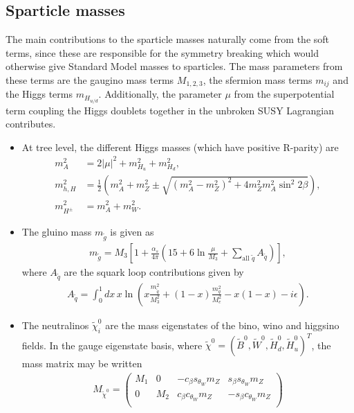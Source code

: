 \documentclass[twoside,english]{uiofysmaster}
\begin{document}
 \subsection{Sparticle masses}
 The main contributions to the sparticle masses naturally come from the soft terms, since these are responsible for the symmetry breaking which would otherwise give Standard Model masses to sparticles. The mass parameters from these terms are the gaugino mass terms $M_{1,2,3}$, the sfermion mass terms $m_{ij}$ and the Higgs terms $m_{H_{u/d}}$. Additionally, the parameter $\mu$ from the superpotential term coupling the Higgs doublets together in the unbroken SUSY Lagrangian contributes.
 \begin{itemize}
 	\item At tree level, the different Higgs masses (which have positive R-parity) are
 	\begin{align}
 		m_A^2 &= 2|\mu|^2 + m^2_{H_u} + m^2_{H_d},\nonumber\\
 		m^2_{h,H} &= \frac{1}{2} \left( m_A^2 + m_Z^2 \pm \sqrt{(m_A^2 - m_Z^2)^2 + 4m_Z^2m_A^2\sin^2 2\beta} \right),\\
 		m^2_{H^\pm} &= m_A^2 + m_W^2.\nonumber
 	\end{align}
 	\item The gluino mass $m_{\tilde g}$ is given as
 	\begin{align}
 		m_{\tilde g} = M_3 \left[ 1 + \frac{\alpha_s}{4\pi}\left( 15 + 6\ln\frac{\mu}{M_3} + \sum_{\mathrm{all} \,\,\tilde q} A_{\tilde q} \right)\right],
 	\end{align}
 	where $A_{\tilde q}$ are the squark loop contributions given by
 	\begin{align}
 		A_{\tilde q} = \int_0^1 dx \, x \ln\left( x \frac{m^2_{\tilde q}}{M_3^2} + (1-x)\frac{m_q^2}{M_e^2} - x(1-x) - i\epsilon \right).
 	\end{align}%
 	\item The neutralinos $\tilde\chi_i^0$ are the mass eigenstates of the bino, wino and higgsino fields. In the gauge eigenstate basis, where $\tilde\chi^{0} = (\tilde B^0, \tilde W^0, \tilde H_d^0, \tilde H_u^0)^T$, the mass matrix may be written
 	\begin{align}
 		M_{\tilde \chi^0} = \begin{pmatrix}
 			M_1 & 0 & - c_\beta s_{\theta_W} m_Z &  s_\beta s_{\theta_W} m_Z \\
 			0 & M_2 &  c_\beta c_{\theta_W} m_Z & - s_\beta c_{\theta_W} m_Z\\

\end{pmatrix}
\end{align}
\end{itemize}
\end{document}
